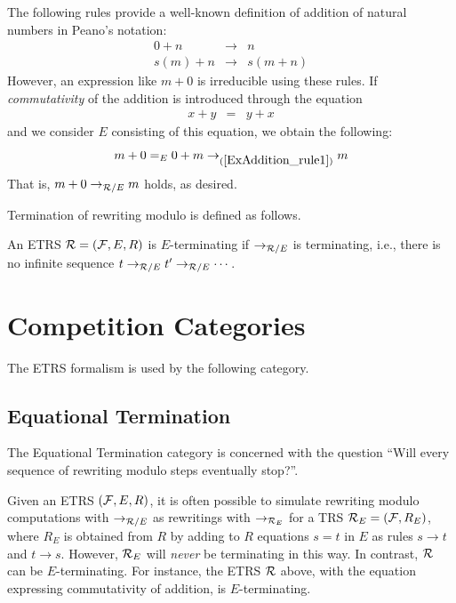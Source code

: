 \begin{example}
The following rules provide a well-known definition of addition of natural numbers in Peano's notation:
\begin{eqnarray}
0 + n & \to & n\label{ExAddition_rule1}
\\
s(m) + n & \to & s(m + n)
\end{eqnarray}
%
However, an expression like $m+0$ is irreducible using these rules.
%
If \emph{commutativity} of the addition is introduced through the equation
\begin{eqnarray}
x + y & = & y+x
\end{eqnarray}
and we consider $E$ consisting of this equation, we obtain the following:
\[m  + 0 =_E 0 + m \to_{(\ref{ExAddition_rule1})} m\]
That is, $m+0\to_{{\cal R}/E}m$ holds, as desired.
\end{example}
%
Termination of rewriting modulo is defined as follows.

\begin{definition}
An ETRS ${\cal R}=({\cal F},E,R)$ is $E$-terminating if $\to_{{\cal R}/E}$ is terminating, i.e., there is no infinite sequence $t\to_{{\cal R}/E}t'\to_{{\cal R}/E}\cdots$.
\end{definition}


\section{Competition Categories}

The ETRS formalism is used by the following category.

\subsection{Equational Termination}

The Equational Termination category is concerned with the question 
``Will every sequence of rewriting modulo steps eventually stop?''. 

\begin{motivation}
Given an ETRS $({{\cal F},E,R})$, it is often possible to simulate rewriting modulo computations with $\to_{{\cal R}/E}$ as rewritings with $\to_{{\cal R}_E}$ for a TRS ${\cal R}_E=({\cal F},R_E)$, where $R_E$ is obtained from $R$  by adding to $R$ equations $s=t$ in $E$ as rules $s\to t$ and $t\to s$.
%
However, ${\cal R}_E$ will \emph{never} be terminating in this way. In contrast, ${\cal R}$ can be $E$-terminating. For instance, the ETRS ${\cal R}$ above, with the  equation expressing commutativity of addition, is $E$-terminating. 
\end{motivation}

